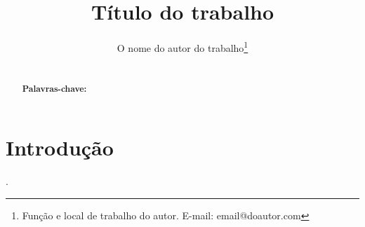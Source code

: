 \documentclass[paper=a4,oneside,fontsize=12pt,parskip=full]{article}
\title{Título do trabalho}
\author{O nome do autor do trabalho\footnote{Função e local de trabalho do autor. E-mail: email@doautor.com}}
\date{}
\begin{document}
	\maketitle

\begin{abstract}
	\noindent\lipsum[1]
	\ \\
	\textbf{Palavras-chave:}
\end{abstract}

\section*{Introdução}
\lipsum[1]. 



\begin{quote}
\lipsum[1]
\end{quote}

%	
\end{document}
